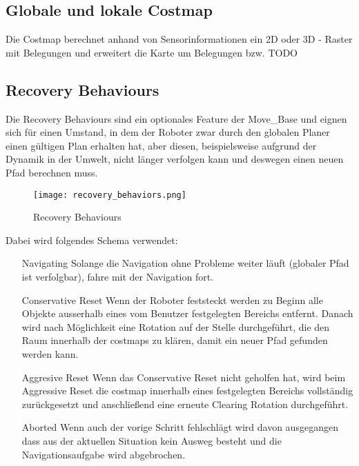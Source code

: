 \documentclass[oribibl]{llncs}
\begin{document}
\subsection{Globale und lokale Costmap}
Die Costmap berechnet anhand von Sensorinformationen ein 2D oder 3D - Raster mit Belegungen und erweitert die Karte um Belegungen bzw. TODO
\cite{costmap2d}
\subsection{Recovery Behaviours}
Die Recovery Behaviours sind ein optionales Feature der Move\_Base und eignen sich für einen Umstand, in dem der Roboter zwar durch den globalen Planer einen gültigen Plan erhalten hat, aber diesen, beispielsweise aufgrund der Dynamik in der Umwelt, nicht länger verfolgen kann und deswegen einen neuen Pfad berechnen muss.\\
\begin{figure}
	\centering
  \texttt{[image: recovery\_behaviors.png]}
	\caption{Recovery Behaviours}
	\cite{recoveryBehavioursImage}
\end{figure}

Dabei wird folgendes Schema verwendet:\cite{recoveryBehaviours}
\begin{enumerate}
\item [Navigating] Solange die Navigation ohne Probleme weiter läuft (globaler Pfad ist verfolgbar), fahre mit der Navigation fort.
\item [Conservative Reset] Wenn der Roboter feststeckt werden zu Beginn alle Objekte ausserhalb eines vom Benutzer festgelegten Bereichs entfernt. Danach wird nach Möglichkeit eine Rotation auf der Stelle durchgeführt, die den Raum innerhalb der costmaps zu klären, damit ein neuer Pfad gefunden werden kann.
\item [Aggresive Reset] Wenn das Conservative Reset nicht geholfen hat, wird beim Aggressive Reset die costmap innerhalb eines festgelegten Bereichs vollständig zurückgesetzt und anschließend eine erneute Clearing Rotation durchgeführt.
\item [Aborted] Wenn auch der vorige Schritt fehlschlägt wird davon ausgegangen dass aus der aktuellen Situation kein Ausweg besteht und die Navigationsaufgabe wird abgebrochen.
\end{enumerate}
\end{document}

